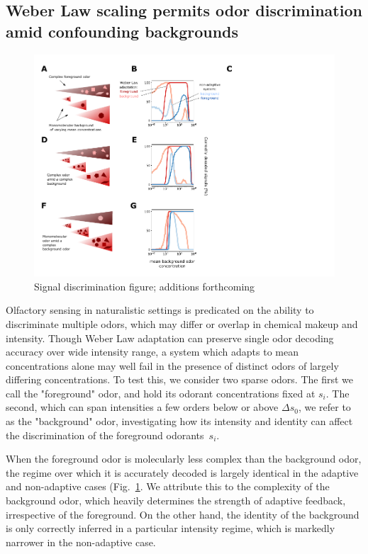 \subsection{Weber Law scaling permits odor discrimination amid confounding backgrounds}

\begin{figure}
	\includegraphics[width=\textwidth]{figures/Figures_signal_discrimination_weber_law}
	\caption{Signal discrimination figure; {\color {blue} additions forthcoming}}
	\label{fig:signal_discrimination}
\end{figure}

Olfactory sensing in naturalistic settings is predicated on the ability to discriminate multiple odors, which may differ or overlap in chemical makeup and intensity. Though Weber Law adaptation can preserve single odor decoding accuracy over wide intensity range, a system which adapts to mean concentrations alone may well fail in the presence of distinct odors of largely differing concentrations. To test this, we consider two sparse odors. The first we call the "foreground" odor, and hold its odorant concentrations fixed at $s_i$. The second, which can span intensities a few orders below or above $\Delta s_0$, we refer to as the "background" odor, investigating how its intensity and identity can affect the discrimination of the foreground odorants~$s_i$. 

When the foreground odor is molecularly less complex than the background odor, the regime over which it is accurately decoded is largely identical in the adaptive and non-adaptive cases (Fig.~\ref{fig:signal_discrimination}. We attribute this to the complexity of the background odor, which heavily determines the strength of adaptive feedback, irrespective of the foreground. On the other hand, the identity of the background is only correctly inferred in a particular intensity regime, which is markedly narrower in the non-adaptive case.

